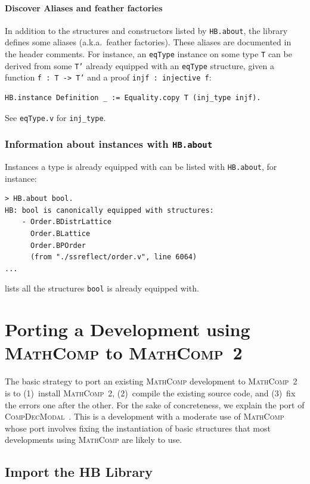 \documentclass{article}
\def\mathcomp{\textsc{MathComp}}
\def\hb{\textsc{HB}}
\def\compdecmodal{\textsc{CompDecModal}}
\def\coqin#1{\texttt{#1}}
\begin{document}
\paragraph{Discover Aliases and feather factories}

In addition to the structures and constructors listed by \coqin{HB.about}, the
library defines some aliases (a.k.a.\ feather factories). These aliases
are documented in the header comments. For instance, an \coqin{eqType}
instance on some type \coqin{T} can be derived from some \coqin{T'} already
equipped with an \coqin{eqType} structure, given a function \coqin{f : T -> T'}
and a proof \coqin{injf : injective f}:
\begin{verbatim}
HB.instance Definition _ := Equality.copy T (inj_type injf).
\end{verbatim}
See \coqin{eqType.v} for \coqin{inj_type}.

\subsubsection{Information about instances with \coqin{HB.about}}

Instances a type is already equipped with can be listed with
\coqin{HB.about}, for instance:
\begin{verbatim}
> HB.about bool.
HB: bool is canonically equipped with structures:
    - Order.BDistrLattice
      Order.BLattice
      Order.BPOrder
      (from "./ssreflect/order.v", line 6064)
...
\end{verbatim}

lists all the structures \coqin{bool} is already equipped with.

\section{Porting a Development using \mathcomp{} to \mathcomp~2}
\label{sec:compdecmodal}

The basic strategy to port an existing \mathcomp{} development to
\mathcomp~2 is to (1)~install \mathcomp~2, (2)~compile the existing source
code, and (3)~fix the errors one after the other.
%
For the sake of concreteness, we explain the port of
\compdecmodal~\cite{compdecmodal}. This is a development with a
moderate use of \mathcomp{} whose port involves fixing the
instantiation of basic structures that most developments using
\mathcomp{} are likely to use.

\subsection{Import the \hb{} Library}
\end{document}

